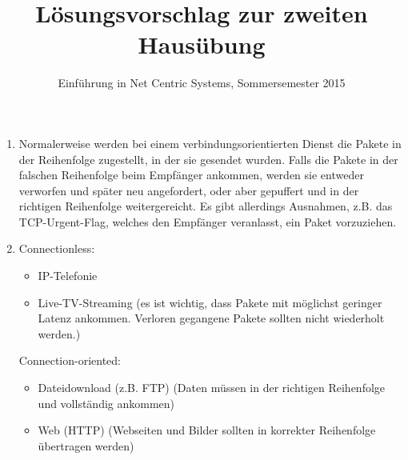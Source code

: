 \documentclass[a4paper,
			llpt,
			solution,
			accentcolor=tud2d,
			colorbacktitle
			]
			{tudexercise}
\title{Lösungsvorschlag zur zweiten Hausübung}
\subtitle{Einführung in Net Centric Systems, Sommersemester 2015}
\begin{document}
\maketitle

\section{}


\begin{enumerate}

\item
Normalerweise werden bei einem verbindungsorientierten Dienst die Pakete in der Reihenfolge zugestellt, in der sie gesendet wurden. Falls die Pakete in der falschen Reihenfolge beim Empfänger ankommen, werden sie entweder verworfen und später neu angefordert, oder aber gepuffert und in der richtigen Reihenfolge weitergereicht.
Es gibt allerdings Ausnahmen, z.B. das TCP-Urgent-Flag, welches den Empfänger veranlasst, ein Paket vorzuziehen.

\item
Connectionless:
\begin{itemize}
\item IP-Telefonie
\item Live-TV-Streaming
(es ist wichtig, dass Pakete mit möglichst geringer Latenz ankommen. Verloren gegangene Pakete sollten nicht wiederholt werden.)
\end{itemize}
Connection-oriented:
\begin{itemize}
\item Dateidownload (z.B. FTP)
(Daten müssen in der richtigen Reihenfolge und vollständig ankommen)
\item Web (HTTP)
(Webseiten und Bilder sollten in korrekter Reihenfolge übertragen werden)
\end{itemize}
\end{enumerate}
\section{}
\section{}
\section{}
\end{document}
